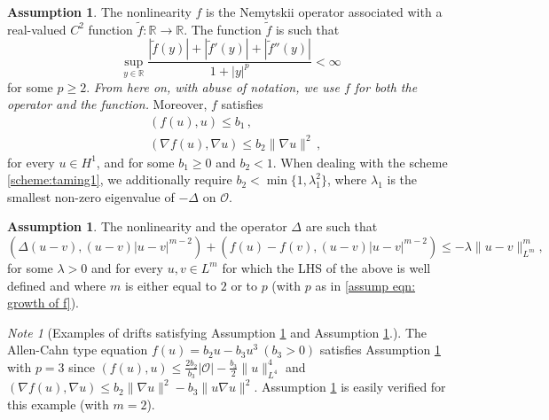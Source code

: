 \documentclass[reqno, 11pt]{amsart}
\theoremstyle{plain}
\theoremstyle{definition}
\newtheorem{assumption}[theorem]{Assumption}
\theoremstyle{remark}
\newtheorem{note}[theorem]{Note}
\numberwithin{equation}{section}
\numberwithin{theorem}{section}
\newcommand{\R}{\mathbb{R}}
\begin{document}
{\begin{assumption}\label{assump1}
The nonlinearity  
$f$ is the Nemytskii operator associated with a real-valued $C^2$ function $\tilde{f}:\R\rightarrow \R$. The function $\tilde f$ is such that
\begin{equation}\label{assump eqn: growth of f}
    \sup_{y \in  \R} \frac{|\tilde{f}(y)|+ |\tilde{f}'(y)|+|\tilde{f}''(y)|}{1+|y|^p} < \infty
\end{equation}
for some $p\geq 2$. {\it From here on, with abuse of notation, we use $f$ for both the operator and the function.}
Moreover, $f$ satisfies
\begin{align}
&(f(u),u)\leq b_1 \, ,\label{eqn:coercive drift}\\
&(\nabla f(u), \nabla u)\leq b_2\|\nabla u\|^2 \, , \label{eqn:assump on gradient of drift}
\end{align}
for every $u \in H^1$, and for some $ b_1\geq 0$ and $b_2<1$. When dealing with the scheme \eqref{scheme:taming1}, we additionally require $b_2<\min\{1, \lambda_1^2\}$, where $\lambda_1$ is the smallest non-zero eigenvalue of $-\Delta$ on $\mathcal{O}$. 
\end{assumption}


\begin{assumption}\label{assump:coercivity assumption on overall drift}
The nonlinearity and the operator $\Delta$ are  such that
\begin{equation} 
    (\Delta(u-v), (u-v) |u-v|^{m-2}) + (f(u)-f(v), (u-v) |u-v|^{m-2}) \leq -  \lambda \|u-v\|_{L^m}^m, 
\end{equation}
for some $\lambda>0$ and for every $u,v \in L^m$ for which the LHS of the above is well defined and where $m$ is either equal to  $2$ or to $p$ (with $p$ as in \eqref{assump eqn: growth of f}). 
\end{assumption}



\begin{note}[Examples of drifts satisfying Assumption \ref{assump1} and Assumption \ref{assump:coercivity assumption on overall drift}.]
The Allen-Cahn type equation $f(u)=b_2u-b_3u^3\ (b_3>0)$ satisfies Assumption \ref{assump1} with $p=3$ since $(f(u),u)\leq \frac{2b_2}{b_3}|\mathcal{O}|-\frac{b_3}{2}\|u\|_{L^4}^4$ and $(\nabla f(u),\nabla u)\leq b_2\|\nabla u\|^2-b_3\|u\nabla u\|^2$. Assumption \ref{assump:coercivity assumption on overall drift} is easily verified for this example (with $m=2$). 


\end{note}}
\end{document}
